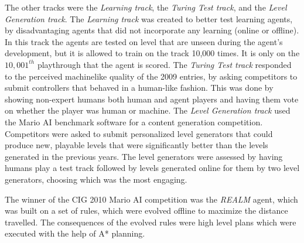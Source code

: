 \documentclass[12pt]{article}
\begin{document}
\begin{multicols}{2}
The other tracks were the \textit {Learning track}, the \textit {Turing Test track}, and the \textit {Level Generation track}. The \textit {Learning track} was created to better test learning agents, by disadvantaging agents that did not incorporate any learning (online or offline). In this track the agents are tested on level that are unseen during the agent's development, but it is allowed to train on the track 10,000 times. It is only on the $10,001^{th}$ playthrough that the agent is scored. The \textit {Turing Test track} responded to the perceived machinelike quality of the 2009 entries, by asking competitors to submit controllers that behaved in a human-like fashion. This was done by showing non-expert humans both human and agent players and having them vote on whether the player was human or machine. The \textit {Level Generation track} used the Mario AI benchmark software for a content generation competition. Competitors were asked to submit personalized level generators that could produce new, playable levels that were significantly better than the levels generated in the previous years. The level generators were assessed by having humans play a test track followed by levels generated online for them by two level generators, choosing which was the most engaging.

The winner of the CIG 2010 Mario AI competition was the \textit{REALM} agent, which was built on a set of rules, which were evolved offline to maximize the distance travelled. The consequences of the evolved rules were high level plans which were executed with the help of A* planning.


\end{multicols}
\end{document}
